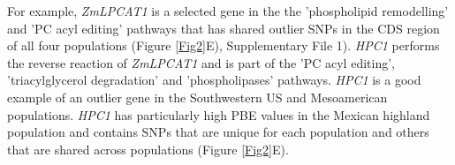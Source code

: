 \documentclass[9pt,twocolumn,twoside,lineno]{BioRxiv}
\begin{document}
For example, \textit{ZmLPCAT1} is a selected gene  in the the 'phospholipid remodelling' and 'PC acyl editing' pathways that has shared outlier SNPs in the CDS region of all four populations (Figure \ref{Fig2}E), Supplementary File 1). %
\textit{HPC1} performs the reverse reaction of \textit{ZmLPCAT1} and is part of the 'PC acyl editing', 'triacylglycerol degradation' and 'phospholipases' pathways. 
\textit{HPC1} is a good example of an outlier gene in the Southwestern US and Mesoamerican populations.
\textit{HPC1} has particularly high PBE values in the Mexican highland population and contains SNPs that are unique for each population and others that are shared across populations (Figure \ref{Fig2}E). 
\end{document}

